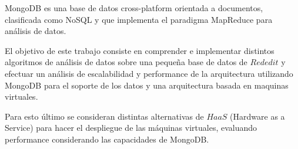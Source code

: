MongoDB es una base de datos cross-platform orientada a documentos, clasificada como NoSQL y que implementa el paradigma MapReduce para análisis de datos.


El objetivo de este trabajo consiste en comprender e implementar distintos algoritmos de análisis de datos sobre una peque\~na base de datos de $Rededit$ y efectuar un análisis de escalabilidad y performance de la arquitectura utilizando MongoDB para el soporte de los datos y una arquitectura basada en maquinas virtuales.


Para esto último se consideran distintas alternativas de $HaaS$ (Hardware as a Service) para hacer el despliegue de las máquinas virtuales, evaluando performance considerando las capacidades de MongoDB.

